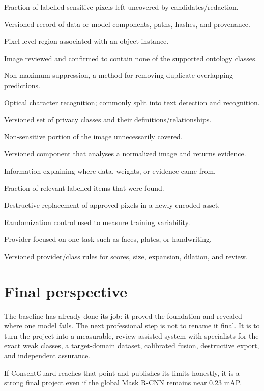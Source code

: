 \begin{description}[leftmargin=40mm,labelwidth=36mm,style=multiline]
  \item[Leakage] Fraction of labelled sensitive pixels left uncovered by candidates/redaction.
  \item[Manifest] Versioned record of data or model components, paths, hashes, and provenance.
  \item[Mask] Pixel-level region associated with an object instance.
  \item[Negative image] Image reviewed and confirmed to contain none of the supported ontology classes.
  \item[NMS] Non-maximum suppression, a method for removing duplicate overlapping predictions.
  \item[OCR] Optical character recognition; commonly split into text detection and recognition.
  \item[Ontology] Versioned set of privacy classes and their definitions/relationships.
  \item[Over-redaction] Non-sensitive portion of the image unnecessarily covered.
  \item[Provider] Versioned component that analyses a normalized image and returns evidence.
  \item[Provenance] Information explaining where data, weights, or evidence came from.
  \item[Recall] Fraction of relevant labelled items that were found.
  \item[Redaction] Destructive replacement of approved pixels in a newly encoded asset.
  \item[Seed] Randomization control used to measure training variability.
  \item[Specialist] Provider focused on one task such as faces, plates, or handwriting.
  \item[Threshold profile] Versioned provider/class rules for scores, size, expansion, dilation, and review.
\end{description}

\section{Final perspective}

The baseline has already done its job: it proved the foundation and revealed where one model fails. The next professional step is not to rename it final. It is to turn the project into a measurable, review-assisted system with specialists for the exact weak classes, a target-domain dataset, calibrated fusion, destructive export, and independent assurance.

If ConsentGuard reaches that point and publishes its limits honestly, it is a strong final project even if the global Mask R-CNN remains near 0.23 mAP.

